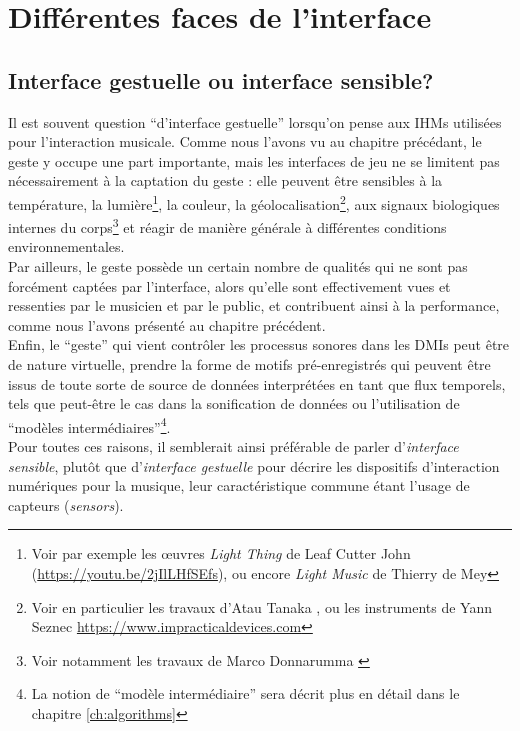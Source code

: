 \section{Différentes faces de l'interface}

\subsection{Interface gestuelle ou interface sensible?}


\noindent Il est souvent question ``d'interface gestuelle'' lorsqu'on pense aux \glspl{IHM} utilisées pour l'interaction musicale. Comme nous l'avons vu au chapitre précédant, le geste y occupe une part importante, mais les interfaces de jeu ne se limitent pas nécessairement à la captation du geste : elle peuvent être sensibles à la température, la lumière\footnote{Voir par exemple les œuvres \textit{Light Thing} de Leaf Cutter John (\url{https://youtu.be/2jIlLHfSEfs}), ou encore \textit{Light Music} de Thierry de Mey}, la couleur, la géolocalisation\footnote{Voir en particulier les travaux d'Atau Tanaka \cite{tanaka_mobile_2004}, ou les instruments de Yann Seznec \url{https://www.impracticaldevices.com}}, aux signaux biologiques internes du corps\footnote{Voir notamment les travaux de Marco Donnarumma \cite{donnarumma_biophysical_2017}} et réagir de manière générale à différentes conditions environnementales.\\
\indent Par ailleurs, le geste possède un certain nombre de qualités qui ne sont pas forcément captées par l'interface, alors qu'elle sont effectivement vues et ressenties par le musicien et par le public, et contribuent ainsi à la performance, comme nous l'avons présenté au chapitre précédent.\\
\indent Enfin, le ``geste'' qui vient contrôler les processus sonores dans les \glspl{DMI} peut être de nature virtuelle, prendre la forme de motifs pré-enregistrés qui peuvent être issus de toute sorte de source de données interprétées en tant que flux temporels, tels que peut-être le cas dans la sonification de données ou l'utilisation de ``modèles intermédiaires''\footnote{La notion de ``modèle intermédiaire'' sera décrit plus en détail dans le chapitre \ref{ch:algorithms}}.\\
\indent Pour toutes ces raisons, il semblerait ainsi préférable de parler d'\textit{interface sensible}, plutôt que d'\textit{interface gestuelle} pour décrire les dispositifs d'interaction numériques pour la musique, leur caractéristique commune étant l'usage de capteurs (\textit{sensors}).
